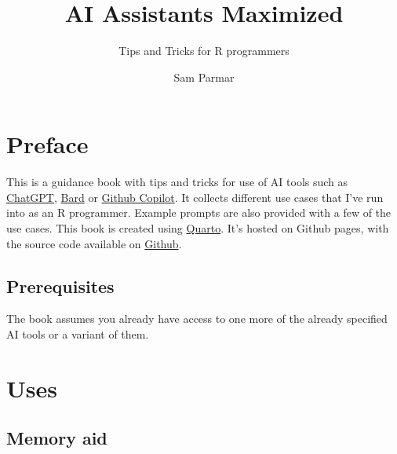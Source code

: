 \documentclass[
  letterpaper,
  DIV=11,
  numbers=noendperiod]{scrreprt}
\title{AI Assistants Maximized}
\subtitle{Tips and Tricks for R programmers}
\author{Sam Parmar}
\date{}
\renewcommand*\contentsname{Table of contents}
\newcommand\contentsname{Table of contents}
\begin{document}
\maketitle
\ifdefined\Shaded\renewenvironment{Shaded}{\begin{tcolorbox}[boxrule=0pt, interior hidden, frame hidden, sharp corners, borderline west={3pt}{0pt}{shadecolor}, enhanced, breakable]}{\end{tcolorbox}}\fi

\renewcommand*\contentsname{Table of contents}
{
\hypersetup{linkcolor=}
\setcounter{tocdepth}{2}
\tableofcontents
}

\hypertarget{preface}{%
\chapter*{Preface}\label{preface}}


This is a guidance book with tips and tricks for use of AI tools such as
\href{https://chat.openai.com/}{ChatGPT},
\href{https://bard.google.com/}{Bard} or
\href{https://github.com/features/copilot}{Github Copilot}. It collects
different use cases that I've run into as an R programmer. Example
prompts are also provided with a few of the use cases. This book is
created using \href{https://quarto.org/}{Quarto}. It's hosted on Github
pages, with the source code available on
\href{https:://www.github.com/parmsam/tips-and-tricks-ai-tools}{Github}.

\hypertarget{prerequisites}{%
\section*{Prerequisites}\label{prerequisites}}


The book assumes you already have access to one more of the already
specified AI tools or a variant of them.


\hypertarget{uses}{%
\chapter{Uses}\label{uses}}

\hypertarget{memory-aid}{%
\section{Memory aid}\label{memory-aid}}
\end{document}
